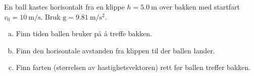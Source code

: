 %
En ball kastes horisontalt fra en klippe $h = \SI{5.0}{\metre}$ over bakken med startfart $v_0 = \SI{10}{\metre\per\second}$. Bruk $\mathrm{g} = \SI{9.81}{\metre\per\second\squared}$.
\begin{enumerate}[a)]
    \item Finn tiden ballen bruker på å treffe bakken.
    \item Finn den horisontale avstanden fra klippen til der ballen lander.
    \item Finn farten (størrelsen av hastighetsvektoren) rett før ballen treffer bakken.
\end{enumerate}
